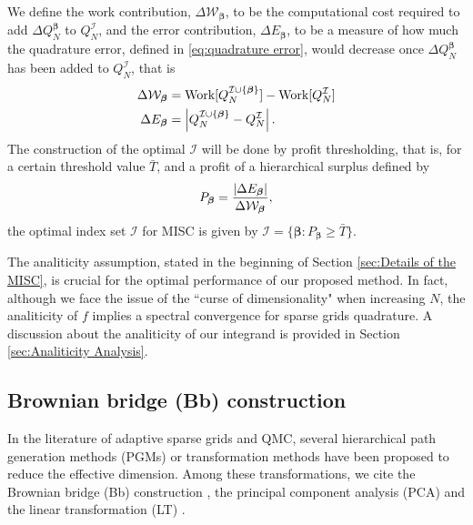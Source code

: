 We define the work contribution, $\Delta \mathcal{W}_{\boldsymbol{\beta}}$, to be the computational cost  required to add  $\Delta Q_N^{\boldsymbol{\beta}}$ to $Q^{\mathcal{I}}_N$, and the error contribution, $\Delta E_{\boldsymbol{\beta}}$, to be  a measure of how much the quadrature error, defined in \eqref{eq:quadrature error}, would decrease once $\Delta Q_N^{\boldsymbol{\beta}}$  has been added to  $Q^{\mathcal{I}}_N$, that is 
\begin{align}\label{eq:Work_error_contributions}
\Delta \mathcal{W}_{\boldsymbol{\beta}} &= \text{Work}[Q^{\mathcal{I} \cup \{\boldsymbol{\beta}\}}_N]-\text{Work}[Q^{\mathcal{I}}_N] \nonumber\\
\Delta E_{\boldsymbol{\beta}} &= \left\lvert Q^{\mathcal{I} \cup \{\boldsymbol{\beta}\}}_N-Q^{\mathcal{I}}_N\right\rvert.
\end{align}
 The  construction of the optimal  $\mathcal{I}$ will be done by profit thresholding, that is, for a certain threshold value $\bar{T}$, and a profit of a hierarchical surplus defined by
 \begin{equation*}
 P_{\boldsymbol{\beta}}= \frac{\left\lvert\Delta E_{\boldsymbol{\beta}}\right\rvert}{\Delta\mathcal{W}_{\boldsymbol{\beta}}},
 \end{equation*}
  the optimal index set  $\mathcal{I}$  for MISC  is given by 
 $\mathcal{I}=\{\boldsymbol{\beta}: P_{\boldsymbol{\beta}}	 \ge \bar{T}\}$.
 
\begin{remark}
The analiticity assumption, stated in the beginning of Section \ref{sec:Details of the MISC}, is crucial for the optimal performance of our proposed method. In fact, although we face the issue of the  ``curse of dimensionality" when increasing $N$, the analiticity of $f$ implies a spectral convergence for sparse grids quadrature. A discussion about the analiticity of our integrand is provided in Section \ref{sec:Analiticity Analysis}.
\end{remark}  
 
\subsection{Brownian bridge (Bb) construction}\label{sec:Brwonian bridge construction}
In the literature of adaptive sparse grids and  QMC, several hierarchical path generation methods (PGMs) or transformation methods have been proposed to reduce the effective dimension. Among these transformations, we cite  the Brownian bridge (Bb)  construction \cite{morokoff1994quasi,moskowitz1996smoothness,caflisch1997valuation}, the principal component analysis (PCA)  \cite{acworth1998comparison} and the linear transformation (LT) \cite{imai2004minimizing}.


